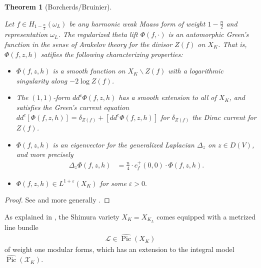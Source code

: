 \documentclass{amsart}
\newtheorem{theorem}{Theorem}[section]
\theoremstyle{definition}
\theoremstyle{definition}
\theoremstyle{definition}
\begin{document}
\begin{theorem}[Borcherds/Bruinier]\label{Bruinier} 

Let $f \in H_{1-\frac{n}{2}}(\omega_L)$ be any harmonic weak Maass form of weight $1-\frac{n}{2}$ and representation $\omega_L$.
The regularized theta lift $\Phi(f, \cdot)$ is an automorphic Green's function in the sense of Arakelov theory for the divisor $Z(f)$ on $X_K$.
That is, $\Phi(f, z, h)$ satifies the following characterizing properties: \\

\begin{itemize}

\item[(i)] $\Phi(f, z, h)$ is a smooth function on $X_K\backslash Z(f)$ with a logarithmic singularity along $-2 \log Z(f)$. \\

\item[(ii)] The $(1,1)$-form $d d^c \Phi(f, z, h)$ has a smooth extension to all of $X_K$, and satisfies the Green's current equation
$d d^c [\Phi(f, z, h)] = \delta_{Z(f)} + [dd^c \Phi(f, z, h)]$ for $\delta_{Z(f)}$ the Dirac current for $Z(f)$. \\

\item[(iii)] $\Phi(f, z, h)$ is an eigenvector for the generalized Laplacian $\Delta_z$ on $z \in D(V)$, and more precisely 
\begin{align*} \Delta_z \Phi(f, z, h) &= \frac{n}{4} \cdot c_f^+(0,0) \cdot \Phi(f, z, h). \end{align*}

\item[(iv)] $\Phi(f, z, h) \in L^{1 + \varepsilon}(X_K)$ for some $\varepsilon >0.$ 

\end{itemize}

\end{theorem}

\begin{proof} See \cite[Theorem 4.3]{BY} and more generally \cite{Br}. \end{proof}

As explained in \cite[$\S 1.1$]{HMP}, the Shimura variety $X_K = X_{K_L}$ comes equipped with a metrized line bundle
\begin{align*} \mathcal{L} \in \widehat{\operatorname{Pic}}(X_K) \end{align*}
of weight one modular forms, which has an extension to the integral model $\widehat{\operatorname{Pic}}(\mathcal{X}_K)$.
\end{document}
